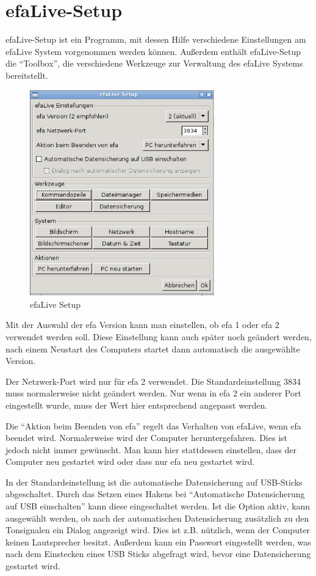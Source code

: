\documentclass[a4paper,12pt,twoside]{article}
\begin{document}
\section{efaLive-Setup}
\label{sct:efalivesetup}
efaLive-Setup ist ein Programm, mit
dessen Hilfe verschiedene Einstellungen am efaLive System vorgenommen
werden können. Außerdem enthält efaLive-Setup die
"`Toolbox"', die verschiedene Werkzeuge zur
Verwaltung des efaLive Systems bereitstellt.

\begin{figure}
    \centering
    \includegraphics[width=8cm]{efaLivede-img/efaLivede-img19.png}
    \caption{efaLive Setup}
    \label{fig:efalivesetup}
\end{figure}

Mit der Auswahl der efa Version kann man einstellen, ob efa 1 oder efa 2
verwendet werden soll. Diese Einstellung kann auch später noch geändert
werden, nach einem Neustart des Computers startet dann automatisch die
ausgewählte Version.

Der Netzwerk-Port wird nur für efa 2 verwendet. Die Standardeinstellung
3834 muss normalerweise nicht geändert werden. Nur wenn in efa 2 ein
anderer Port eingestellt wurde, muss der Wert hier entsprechend
angepasst werden.

Die "`Aktion beim Beenden von efa"' regelt das
Verhalten von efaLive, wenn efa beendet wird. Normalerweise wird der
Computer heruntergefahren. Dies ist jedoch nicht immer gewünscht. Man
kann hier stattdessen einstellen, dass der Computer neu gestartet wird
oder dass nur efa neu gestartet wird.

In der Standardeinstellung ist die automatische Datensicherung auf
USB-Sticks abgeschaltet. Durch das Setzen eines Hakens bei
"`Automatische Datensicherung auf USB
einschalten"' kann diese eingeschaltet werden. Ist die
Option aktiv, kann ausgewählt werden, ob nach der automatischen
Datensicherung zusätzlich zu den Tonsignalen ein Dialog angezeigt wird.
Dies ist z.B. nützlich, wenn der Computer keinen Lautsprecher besitzt. 
Außerdem kann ein Passwort eingestellt werden, was nach dem Einstecken
eines USB Sticks abgefragt wird, bevor eine Datensicherung gestartet wird.
\end{document}
